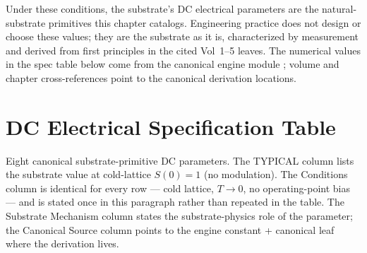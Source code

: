 Under these conditions, the substrate's DC electrical parameters are the natural-substrate primitives this chapter catalogs. Engineering practice does not design or choose these values; they are the substrate as it is, characterized by measurement and derived from first principles in the cited Vol~1--5 leaves. The numerical values in the spec table below come from the canonical engine module ; volume and chapter cross-references point to the canonical derivation locations.

\section{DC Electrical Specification Table}
\label{sec:vol9_dc_spec_table}

Eight canonical substrate-primitive DC parameters. The TYPICAL column lists the substrate value at cold-lattice $S(0) = 1$ (no modulation). The Conditions column is identical for every row --- cold lattice, $T \to 0$, no operating-point bias --- and is stated once in this paragraph rather than repeated in the table. The Substrate Mechanism column states the substrate-physics role of the parameter; the Canonical Source column points to the engine constant + canonical leaf where the derivation lives.

